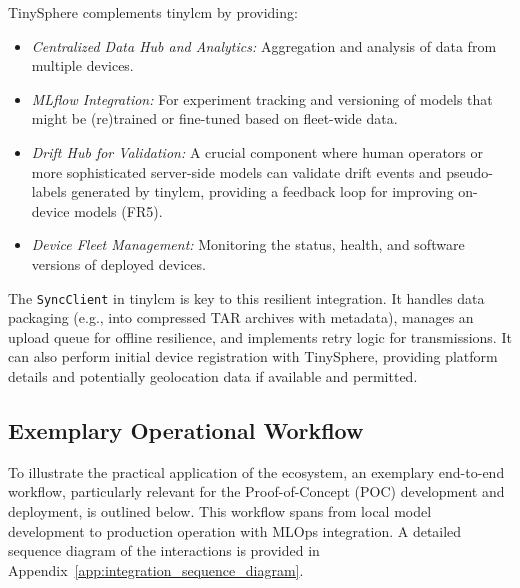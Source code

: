 TinySphere complements \gls{tinylcm} by providing:
\begin{itemize}[noitemsep, topsep=0pt]
    \item \textit{Centralized Data Hub and Analytics:} Aggregation and analysis of data from multiple devices.
    \item \textit{MLflow Integration:} For experiment tracking and versioning of models that might be (re)trained or fine-tuned based on fleet-wide data.
    \item \textit{Drift Hub for Validation:} A crucial component where human operators or more sophisticated server-side models can validate drift events and pseudo-labels generated by \gls{tinylcm}, providing a feedback loop for improving on-device models (FR5).
    \item \textit{Device Fleet Management:} Monitoring the status, health, and software versions of deployed devices.
\end{itemize}

The \texttt{SyncClient} in \gls{tinylcm} is key to this resilient integration. It handles data packaging (e.g., into compressed TAR archives with metadata), manages an upload queue for offline resilience, and implements retry logic for transmissions. It can also perform initial device registration with TinySphere, providing platform details and potentially geolocation data if available and permitted.

\subsection{Exemplary Operational Workflow}
\label{ssec:ecosystem_workflow}

To illustrate the practical application of the ecosystem, an exemplary end-to-end workflow, particularly relevant for the Proof-of-Concept (POC) development and deployment, is outlined below. This workflow spans from local model development to production operation with MLOps integration. A detailed sequence diagram of the interactions is provided in Appendix~\ref{app:integration_sequence_diagram}.


